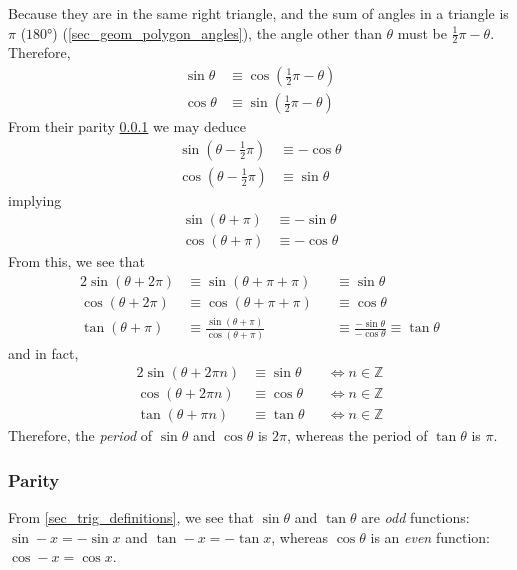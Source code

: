 \documentclass[fleqn,a4paper,11pt]{article}
\newcommand{\setstyle}{\mathbb}
\newcommand{\Integers}{\setstyle Z}
\begin{document}
    Because they are in the same right triangle, and the sum of angles in a
    triangle is \(\pi\) (\(\ang{180}\)) (\ref{sec_geom_polygon_angles}), the
    angle other than \(\theta\) must be \(\frac 12 \pi - \theta\). Therefore,
    \begin{align}
    \sin \theta &\equiv \cos(\frac 12 \pi - \theta) \\
    \cos \theta &\equiv \sin(\frac 12 \pi - \theta)
    \end{align}
    From their parity \ref{sec_trig_parity} we may deduce
    \begin{align}
    \sin(\theta - \frac 12 \pi) &\equiv -\cos \theta \\
    \cos(\theta - \frac 12 \pi) &\equiv \sin \theta
    \end{align}
    implying
    \begin{align}
    \sin(\theta + \pi) &\equiv -\sin \theta \\
    \cos(\theta + \pi) &\equiv -\cos \theta
    \end{align}
    From this, we see that
    \begin{alignat}{2}
    \sin(\theta + 2\pi) &\equiv \sin(\theta + \pi + \pi) &&\equiv \sin \theta \\
    \cos(\theta + 2\pi) &\equiv \cos(\theta + \pi + \pi) &&\equiv \cos \theta \\
    \tan(\theta + \pi) &\equiv \frac{\sin(\theta + \pi)}{\cos(\theta + \pi)}
        &&\equiv \frac{-\sin \theta}{-\cos \theta} \equiv \tan \theta
    \end{alignat}
    and in fact,
    \begin{alignat}{2}
    \sin(\theta + 2\pi n) &\equiv \sin \theta &&\iff n \in \Integers \\
    \cos(\theta + 2\pi n) &\equiv \cos \theta &&\iff n \in \Integers \\
    \tan(\theta + \pi n) &\equiv \tan \theta &&\iff n \in \Integers
    \end{alignat}
    Therefore, the \emph{period} of \(\sin \theta\) and \(\cos \theta\) is
    \(2\pi\), whereas the period of \(\tan \theta\) is \(\pi\).

    \subsubsection{Parity} \label{sec_trig_parity}

    From \ref{sec_trig_definitions}, we see that \(\sin \theta\) and
    \(\tan \theta\) are \emph{odd} functions:
    \(\sin -x = -\sin x\) and \(\tan -x = -\tan x\),
    whereas \(\cos \theta\) is an \emph{even} function:
    \(\cos -x = \cos x\).
\end{document}
